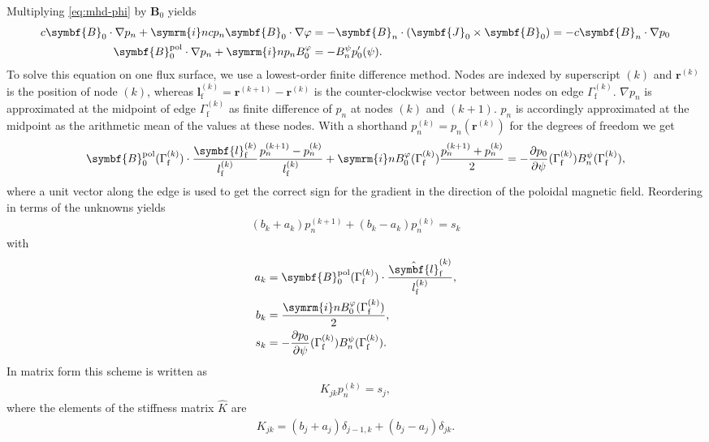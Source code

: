 \documentclass[a4paper, twoside, 10pt, english]{article}
\numberwithin{equation}{section}
\let\temp\varrho
\let\varrho\rho
\let\rho\temp
\let\temp\vartheta
\let\vartheta\theta
\let\theta\temp
\let\temp\varphi
\let\varphi\phi
\let\phi\temp
\let\vec\symbf
\newcommand*\grad{\ensuremath{\nabla}}
\newcommand*\im{\ensuremath{\symrm{i}}}  %
\newcommand*\pd[2][]{\ensuremath{\frac{\partial #1}{\partial #2}}}  %
\newcommand*\pol{\ensuremath{\textrm{pol}}}  %
\newcommand*\fs{\ensuremath{\textrm{f}}}  %
\begin{document}
Multiplying \cref{eq:mhd-phi} by $\vec{B}_{0}$ yields
\begin{align}
  c \vec{B}_{0} \cdot \grad p_{n} + \im n c p_{n} \vec{B}_{0} \cdot \grad \phi &= -\vec{B}_{n} \cdot (\vec{J}_{0} \times \vec{B}_{0}) = -c \vec{B}_{n} \cdot \grad p_{0} \nonumber \\
  \vec{B}_{0}^{\pol} \cdot \grad p_{n} + \im n p_{n} B_{0}^{\phi} &= -B_{n}^{\psi} p_{0}'(\psi). \label{eq:pn}
\end{align}
To solve this equation on one flux surface, we use a lowest-order finite difference method. Nodes are indexed by superscript $(k)$ and $\vec{r}^{(k)}$ is the position of node $(k)$, whereas $\vec{l}_{\fs}^{(k)} = \vec{r}^{(k+1)} - \vec{r}^{(k)}$ is the counter-clockwise vector between nodes on edge $\Gamma_{\fs}^{(k)}$. $\grad p_{n}$ is approximated at the midpoint of edge $\Gamma_{\fs}^{(k)}$ as finite difference of $p_{n}$ at nodes $(k)$ and $(k+1)$. $p_{n}$ is accordingly approximated at the midpoint as the arithmetic mean of the values at these nodes. With a shorthand $p_{n}^{(k)} = p_{n} (\vec{r}^{(k)})$ for the degrees of freedom we get
\begin{gather}
  \vec{B}_{0}^{\pol} (\Gamma_{\fs}^{(k)}) \cdot \frac{\vec{l}_{\fs}^{(k)}}{l_{\fs}^{(k)}} \frac{p_{n}^{(k+1)} - p_{n}^{(k)}}{l_{\fs}^{(k)}} + \im n B_{0}^{\phi} (\Gamma_{\fs}^{(k)}) \frac{p_{n}^{(k+1)} + p_{n}^{(k)}}{2} = -\pd[p_{0}]{\psi} (\Gamma_{\fs}^{(k)}) B_{n}^{\psi} (\Gamma_{\fs}^{(k)}),
\end{gather}
where a unit vector along the edge is used to get the correct sign for the gradient in the direction of the poloidal magnetic field. Reordering in terms of the unknowns yields
\begin{gather}
  (b_{k} + a_{k}) p_{n}^{(k+1)} + (b_{k} - a_{k}) p_{n}^{(k)} = s_{k}
\end{gather}
with
\begin{align}
  a_{k} &= \vec{B}_{0}^{\pol} (\Gamma_{\fs}^{(k)}) \cdot \frac{\hat{\vec{l}}_{\fs}^{(k)}}{l_{\fs}^{(k)}}, \\
  b_{k} &= \frac{\im n B_{0}^{\phi} (\Gamma_{\fs}^{(k)})}{2}, \\
  s_{k} &= -\pd[p_{0}]{\psi} (\Gamma_{\fs}^{(k)}) B_{n}^{\psi} (\Gamma_{\fs}^{(k)}).
\end{align}
In matrix form this scheme is written as
\begin{gather}
  K_{jk} p_{n}^{(k)} = s_{j},
\end{gather}
where the elements of the stiffness matrix $\hat{K}$ are
\begin{gather}
  K_{jk} = (b_{j} + a_{j}) \delta_{j-1, k} + (b_{j} - a_{j}) \delta_{jk}.
\end{gather}
\end{document}

